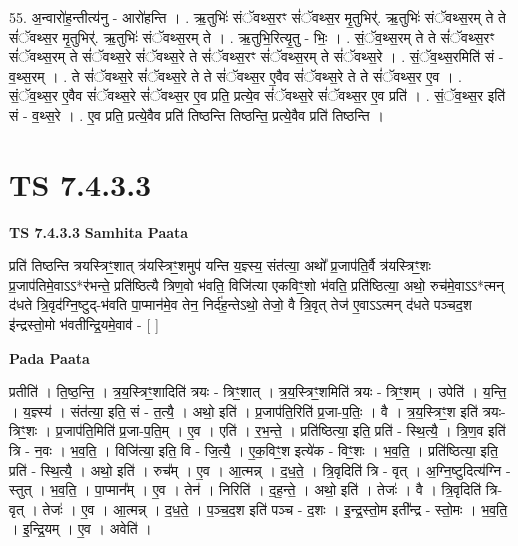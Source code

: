 \documentclass[17pt]{extarticle}
\begin{document}
55. अ॒न्वारो॑ह॒न्तीत्य॑नु - आरो॑हन्ति । . ऋ॒तुभिः॑ संॅवथ्स॒रꣳ सं॑ॅवथ्स॒र मृ॒तुभिर्॑. ऋ॒तुभिः॑ संॅवथ्स॒रम् ते ते सं॑ॅवथ्स॒र मृ॒तुभिर्॑. ऋ॒तुभिः॑ संॅवथ्स॒रम् ते । . ऋ॒तुभि॒रित्यृ॒तु - भिः॒ । . सं॒ॅव॒थ्स॒रम् ते ते सं॑ॅवथ्स॒रꣳ सं॑ॅवथ्स॒रम् ते सं॑ॅवथ्स॒रे सं॑ॅवथ्स॒रे ते सं॑ॅवथ्स॒रꣳ सं॑ॅवथ्स॒रम् ते सं॑ॅवथ्स॒रे । . सं॒ॅव॒थ्स॒रमिति॑ सं - व॒थ्स॒रम् । . ते सं॑ॅवथ्स॒रे सं॑ॅवथ्स॒रे ते ते सं॑ॅवथ्स॒र ए॒वैव सं॑ॅवथ्स॒रे ते ते सं॑ॅवथ्स॒र ए॒व । . सं॒ॅव॒थ्स॒र ए॒वैव सं॑ॅवथ्स॒रे सं॑ॅवथ्स॒र ए॒व प्रति॒ प्रत्ये॒व सं॑ॅवथ्स॒रे सं॑ॅवथ्स॒र ए॒व प्रति॑ । . सं॒ॅव॒थ्स॒र इति॑ सं - व॒थ्स॒रे । . ए॒व प्रति॒ प्रत्ये॒वैव प्रति॑ तिष्ठन्ति तिष्ठन्ति॒ प्रत्ये॒वैव प्रति॑ तिष्ठन्ति । \newline
\pagebreak
{}

\section{ TS 7.4.3.3 }

\textbf{TS 7.4.3.3 } \newline
\textbf{Samhita Paata} \newline

प्रति॑ तिष्ठन्ति त्रयस्त्रिꣳ॒॒शात् त्र॑यस्त्रिꣳ॒॒शमुप॑ यन्ति य॒ज्ञ्स्य॒ संत॑त्या॒ अथो᳚ प्र॒जाप॑ति॒र्वै त्र॑यस्त्रिꣳ॒॒शः प्र॒जाप॑तिमे॒वाऽऽ*र॑भन्ते॒ प्रति॑ष्ठित्यै त्रिण॒वो भ॑वति॒ विजि॑त्या एकविꣳ॒॒शो भ॑वति॒ प्रति॑ष्ठित्या॒ अथो॒ रुच॑मे॒वाऽऽ*त्मन् द॑धते त्रि॒वृद॑ग्नि॒ष्टुद्-भ॑वति पा॒प्मान॑मे॒व तेन॒ निर्द॑ह॒न्तेऽथो॒ तेजो॒ वै त्रि॒वृत् तेज॑ ए॒वाऽऽत्मन् द॑धते पञ्चद॒श इ॑न्द्रस्तो॒मो भ॑वतीन्द्रि॒यमे॒वाव॑ - [  ] \newline

\textbf{Pada Paata} \newline

प्रतीति॑ । ति॒ष्ठ॒न्ति॒ । त्र॒य॒स्त्रिꣳ॒॒शादिति॑ त्रयः - त्रिꣳ॒॒शात् । त्र॒य॒स्त्रिꣳ॒॒शमिति॑ त्रयः - त्रिꣳ॒॒शम् । उपेति॑ । य॒न्ति॒ । य॒ज्ञ्स्य॑ । संत॑त्या॒ इति॒ सं - त॒त्यै॒ । अथो॒ इति॑ । प्र॒जाप॑ति॒रिति॑ प्र॒जा-प॒तिः॒ । वै । त्र॒य॒स्त्रिꣳ॒॒श इति॑ त्रयः-त्रिꣳ॒॒शः । प्र॒जाप॑ति॒मिति॑ प्र॒जा-प॒ति॒म् । ए॒व । एति॑ । र॒भ॒न्ते॒ । प्रति॑ष्ठित्या॒ इति॒ प्रति॑ - स्थि॒त्यै॒ । त्रि॒ण॒व इति॑ त्रि - न॒वः । भ॒व॒ति॒ । विजि॑त्या॒ इति॒ वि - जि॒त्यै॒ । ए॒क॒विꣳ॒॒श इत्ये॑क - विꣳ॒॒शः । भ॒व॒ति॒ । प्रति॑ष्ठित्या॒ इति॒ प्रति॑ - स्थि॒त्यै॒ । अथो॒ इति॑ । रुच᳚म् । ए॒व । आ॒त्मन्न् । द॒ध॒ते॒ । त्रि॒वृदिति॑ त्रि - वृत् । अ॒ग्नि॒ष्टुदित्य॑ग्नि - स्तुत् । भ॒व॒ति॒ । पा॒प्मान᳚म् । ए॒व । तेन॑ । निरिति॑ । द॒ह॒न्ते॒ । अथो॒ इति॑ । तेजः॑ । वै । त्रि॒वृदिति॑ त्रि-वृत् । तेजः॑ । ए॒व । आ॒त्मन्न् । द॒ध॒ते॒ । प॒ञ्च॒द॒श इति॑ पञ्च - द॒शः । इ॒न्द्र॒स्तो॒म इती᳚न्द्र - स्तो॒मः । भ॒व॒ति॒ । इ॒न्द्रि॒यम् । ए॒व । अवेति॑ ।  \newline
\end{document}
